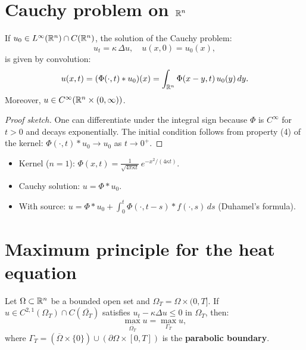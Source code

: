 \section{Cauchy problem on $\mathbb{R}^n$}

\begin{theorem}
If $u_0 \in L^\infty(\mathbb{R}^n) \cap C(\mathbb{R}^n)$, the solution of the Cauchy problem:
\[
    u_t = \kappa\, \Delta u, \quad u(x,0) = u_0(x),
\]
is given by convolution:
\begin{equation}\label{eq:cauchy_solution_heat}
    u(x,t) = (\Phi(\cdot, t) * u_0)(x)
    = \int_{\mathbb{R}^n} \Phi(x-y, t)\, u_0(y)\, dy.
\end{equation}
Moreover, $u \in C^\infty(\mathbb{R}^n \times (0,\infty))$.
\end{theorem}

\begin{proof}[Proof sketch]
One can differentiate under the integral sign because $\Phi$ is $C^\infty$
for $t > 0$ and decays exponentially. The initial condition follows from
property (4) of the kernel: $\Phi(\cdot, t) * u_0 \to u_0$ as $t \to 0^+$.
\end{proof}

\begin{keyformulas}[title=\textbf{Heat equation --- key formulas}]
\begin{itemize}
    \item Kernel ($n=1$): $\Phi(x,t) = \frac{1}{\sqrt{4\pi\kappa t}}\, e^{-x^2/(4\kappa t)}$.
    \item Cauchy solution: $u = \Phi * u_0$.
    \item With source: $u = \Phi * u_0 + \int_0^t \Phi(\cdot, t-s) * f(\cdot, s)\, ds$
          (Duhamel's formula).
\end{itemize}
\end{keyformulas}

\section{Maximum principle for the heat equation}

\begin{theorem}
Let $\Omega \subset \mathbb{R}^n$ be a bounded open set and
$\Omega_T = \Omega \times (0,T]$. If $u \in C^{2,1}(\Omega_T) \cap C(\overline{\Omega_T})$
satisfies $u_t - \kappa\Delta u \leq 0$ in $\Omega_T$, then:
\begin{equation}\label{eq:weak_max_heat}
    \max_{\overline{\Omega_T}} u = \max_{\Gamma_T} u,
\end{equation}
where $\Gamma_T = (\overline{\Omega} \times \{0\}) \cup (\partial\Omega \times [0,T])$
is the \textbf{parabolic boundary}.
\end{theorem}

